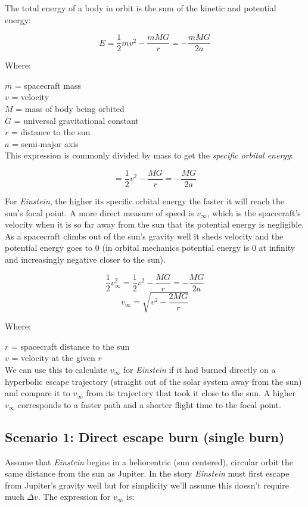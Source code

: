 \documentclass[12pt]{article} %
\begin{document}
The total energy of a body in orbit is the sum of the kinetic and potential energy:

$$ E = \frac{1}{2} mv^2 - \frac{mMG}{r} = -\frac{mMG}{2a}$$

Where:

$m$ = spacecraft mass \\
$v$ = velocity \\
$M$ = mass of body being orbited\\
$G$ = universal gravitational constant\\
$r$ = distance to the sun\\
$a$ = semi-major axis\\

This expression is commonly divided by mass to get the \textit{specific orbital energy}:

$$ = \frac{1}{2} v^2 - \frac{MG}{r} = -\frac{MG}{2a}$$

For \textit{Einstein}, the higher its specific orbital energy the faster it will reach the sun's focal point. A more direct measure of speed is $v_{\infty}$, which is the spacecraft's velocity when it is so far away from the sun that its potential energy is negligible. As a spacecraft climbs out of the sun's gravity well it sheds velocity and the potential energy goes to 0 (in orbital mechanics potential energy is 0 at infinity and increasingly negative closer to the sun).

$$\frac{1}{2}v_{\infty}^{2} = \frac{1}{2} v^2 - \frac{MG}{r} = -\frac{MG}{2a}$$
$$v_{\infty} = \sqrt{v^2-\frac{2MG}{r}}$$

Where:

$r$ = spacecraft distance to the sun\\
$v$ = velocity at the given $r$\\

We can use this to calculate $v_{\infty}$ for \textit{Einstein} if it had burned directly on a hyperbolic escape trajectory (straight out of the solar system away from the sun) and compare it to $v_{\infty}$ from its trajectory that took it close to the sun. A higher $v_{\infty}$ corresponds to a faster path and a shorter flight time to the focal point.

\subsection{Scenario 1: Direct escape burn (single burn)}

Assume that \textit{Einstein} begins in a heliocentric (sun centered), circular orbit the same distance from the sun as Jupiter. In the story \textit{Einstein} must first escape from Jupiter's gravity well but for simplicity we'll assume this doesn't require much $\Delta v$. The expression for $v_{\infty}$ is:
\end{document}
